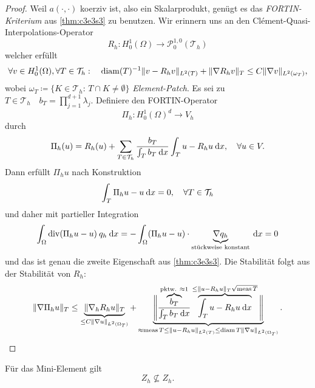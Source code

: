 \documentclass[../skript.tex]{subfiles}
\begin{document}
\begin{proof}
	Weil $a(\cdot,\cdot)$ koerziv ist, also ein Skalarprodukt, genügt es das \emph{FORTIN-Kriterium} aus \cref{thm:c3e3s3} zu benutzen. \newline\noindent
	Wir erinnern uns an den Clément-Quasi-Interpolations-Operator
	\[
		R_h:H^1_0(\Omega)\to\mathcal{P}^{1,0}_0(\mathcal{T}_h)
	\]
	welcher erfüllt
	\[
		\forall v\in H^1_0(\Omega),\forall T\in\mathcal{T}_h:\quad \operatorname*{diam} (T)^{-1}\|v-R_hv\|_{L^2(T)} + \|\nabla R_h v\|_T \leq C\|\nabla v\|_{L^2(\omega_T)},
	\]
	wobei $\omega_T \coloneqq \{ K\in\mathcal{T}_h:\,T\cap K\not=\emptyset\}$ \emph{Element-Patch}.\newline\noindent
	Es sei zu $T\in\mathcal{T}_h\quad b_T= \prod_{j=1}^{d+1}\lambda_j$. Definiere den FORTIN-Operator
	\[
		\Pi_h: H^1_0(\Omega)^d \to V_h
	\] 
	durch
	\[
		\Pi_h(u) = R_h(u) + \sum_{T\in\mathcal{T}_h} \frac{b_T}{\int_T b_T\:\mathrm{d}x}\int_T u-R_h u\:\mathrm{d}x,\quad\forall u\in V.
	\]
	Dann erfüllt $\Pi_hu$ nach Konstruktion
	\[
		\int_T \Pi_h u - u\:\mathrm{d}x = 0,\quad\forall T\in\mathcal{T}_h
	\]
	und daher mit partieller Integration
	\[
		\int_\Omega \operatorname{div}(\Pi_hu-u)\:q_h\:\mathrm{d}x = -\int_\Omega (\Pi_hu - u)\cdot\underbrace{\nabla q_h}_{\text{stückweise konstant}}\:\mathrm{d}x = 0
	\]
	und das ist genau die zweite Eigenschaft aus \cref{thm:c3e3s3}. Die Stabilität folgt aus der Stabilität von $R_h$:
	\[
		\|\nabla\Pi_h u\|_T\leq 
		\underbrace
		{
			\|\nabla_h R_h u\|_T}_{\leq C\|\nabla u\|
			_
			{L^2(\Omega_T)}
		} 
		+
		\underbrace
		{ 
			\Bigg\| 
				\frac
				{
					\overbrace
					{
						b_T
					}
						^
					{
						\text{pktw. }\approx1
					}
				}
				{
					\int_T b_T\:\mathrm{d}x
				} 
				\overbrace
				{
					\int_T u-R_hu\:\mathrm{d}x
				}
					^
				{
					\leq\|u-R_hu\|_T\sqrt{\operatorname{meas} T}
				} 
			\Bigg\|
		}
			_
		{
			\approx \operatorname{meas} T\leq \|u-R_hu\|_{L^2(T)}\leq\operatorname*{diam} T\|\nabla u\|_{L^2(\Omega_T)}
		}.
	\]
\end{proof}
Für das Mini-Element gilt
\[
	Z_h\not\subseteq Z_h.
\]
\end{document}
